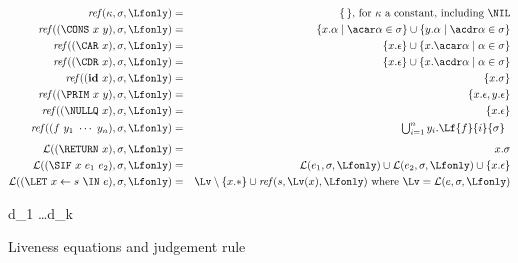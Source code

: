 \documentclass{llncs}
\newcommand{\ID}{\mbox{$\mathbf{ id}$}} %
\begin{document}
\begin{figure}[t]  
\begin{eqnarray*}
\mathit{ref\/}(\kappa,\sigma,\Lfonly)
          &=& \{\,\} \mbox{, for $\kappa$ a constant, including $\NIL$}\\
\mathit{ref\/}((\CONS~x~y),\sigma,\Lfonly)
          &=& \{x.\alpha \mid \acar\alpha \in \sigma\} \cup \{y.\alpha \mid \acdr\alpha \in \sigma\} \\
\mathit{ref\/}((\CAR~x),\sigma,\Lfonly)
          &=& \{x.\epsilon\} \cup \{x.\acar\alpha \mid \alpha \in \sigma\} \\
\mathit{ref\/}((\CDR~x),\sigma,\Lfonly)
          &=& \{x.\epsilon\} \cup \{x.\acdr\alpha \mid \alpha \in \sigma\} \\
\mathit{ref\/}((\ID~x),\sigma,\Lfonly)
          &=& \{x.\sigma\} \\
\mathit{ref\/}((\PRIM~x~y),\sigma,\Lfonly)
          &=& \{x.\epsilon,y.\epsilon\} \\
\mathit{ref\/}((\NULLQ~x),\sigma,\Lfonly)
          &=& \{x.\epsilon\} \\
\mathit{ref\/}((f~y_1~\cdots~y_n),\sigma,\Lfonly)
          &=&  \begin{array}{@{}l}  %
               \bigcup_{i=1}^n y_i.\Lf{f}{i}{\sigma}
               \end{array}
\\[1ex]
\mathcal{L}((\RETURN~x),\sigma,\Lfonly) &=& x.\sigma \\
\mathcal{L}((\SIF~x~e_1~e_2),\sigma,\Lfonly) &=&
        \mathcal{L}(e_1,\sigma,\Lfonly) \cup
        \mathcal{L}(e_2,\sigma,\Lfonly) \cup
        \{x.\epsilon\} \\
\mathcal{L}((\LET~x \leftarrow  s~\IN~e),\sigma,\Lfonly) &=&
        \Lv
           \setminus \{x.*\}
           \cup \mathit{ref\/}(s,\Lv(x),\Lfonly)
\mbox{ where } \Lv = \mathcal{L}(e,\sigma,\Lfonly)
\end{eqnarray*}

\begin{minipage}{0.85\textwidth}
        { d_1 \ldots d_k \len \Lfonly
\\ }
\end{minipage}

\normalsize
  \caption{Liveness equations and judgement rule}\label{fig:live-judge}
\end{figure}
%
\end{document}
